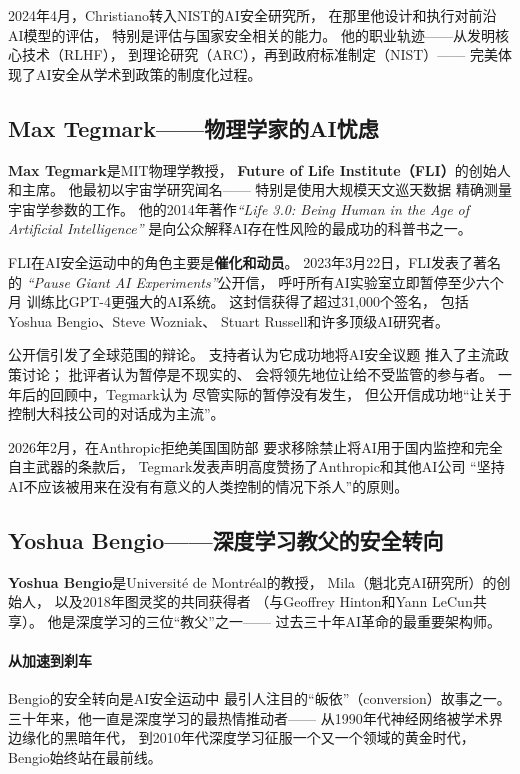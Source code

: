 2024年4月，Christiano转入NIST的AI安全研究所，
在那里他设计和执行对前沿AI模型的评估，
特别是评估与国家安全相关的能力。
他的职业轨迹——从发明核心技术（RLHF），
到理论研究（ARC），再到政府标准制定（NIST）——
完美体现了AI安全从学术到政策的制度化过程。

\subsection{Max Tegmark——物理学家的AI忧虑}
\label{subsec:tegmark}

\textbf{Max Tegmark}是MIT物理学教授，
\textbf{Future of Life Institute（FLI）}的创始人和主席。
他最初以宇宙学研究闻名——
特别是使用大规模天文巡天数据
精确测量宇宙学参数的工作。
他的2014年著作\textit{``Life 3.0: Being Human in the Age of
Artificial Intelligence''}
是向公众解释AI存在性风险的最成功的科普书之一。

FLI在AI安全运动中的角色主要是\textbf{催化和动员}。
2023年3月22日，FLI发表了著名的
\textit{``Pause Giant AI Experiments''}公开信，
呼吁所有AI实验室立即暂停至少六个月
训练比GPT-4更强大的AI系统。
这封信获得了超过31,000个签名，
包括Yoshua Bengio、Steve Wozniak、
Stuart Russell和许多顶级AI研究者。

公开信引发了全球范围的辩论。
支持者认为它成功地将AI安全议题
推入了主流政策讨论；
批评者认为暂停是不现实的、
会将领先地位让给不受监管的参与者。
一年后的回顾中，Tegmark认为
尽管实际的暂停没有发生，
但公开信成功地``让关于控制大科技公司的对话成为主流''。

2026年2月，在Anthropic拒绝美国国防部
要求移除禁止将AI用于国内监控和完全自主武器的条款后，
Tegmark发表声明高度赞扬了Anthropic和其他AI公司
``坚持AI不应该被用来在没有有意义的人类控制的情况下杀人''的原则。

\subsection{Yoshua Bengio——深度学习教父的安全转向}
\label{subsec:bengio}

\textbf{Yoshua Bengio}是Université de Montréal的教授，
Mila（魁北克AI研究所）的创始人，
以及2018年图灵奖的共同获得者
（与Geoffrey Hinton和Yann LeCun共享）。
他是深度学习的三位``教父''之一——
过去三十年AI革命的最重要架构师。

\paragraph{从加速到刹车}
Bengio的安全转向是AI安全运动中
最引人注目的``皈依''（conversion）故事之一。
三十年来，他一直是深度学习的最热情推动者——
从1990年代神经网络被学术界边缘化的黑暗年代，
到2010年代深度学习征服一个又一个领域的黄金时代，
Bengio始终站在最前线。

